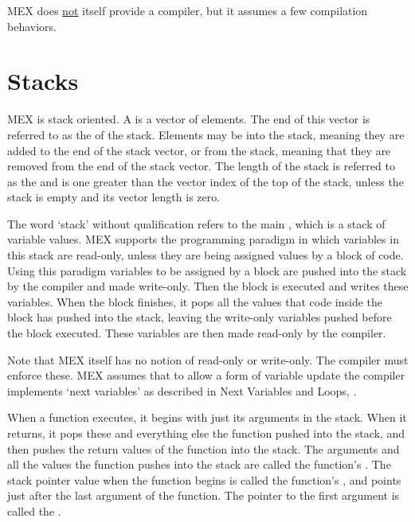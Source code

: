 \documentclass[12pt]{article}
\begin{document}
MEX does \underline{not} itself provide a compiler, but it
assumes a few compilation behaviors.

\section{Stacks}
\label{STACKS}

MEX is stack oriented.  A  is a vector of
elements.  The end of this vector is referred to as the
 of the stack.  Elements may be 
into the stack, meaning they are added to the end of the stack vector,
or  from the stack,
meaning that they are removed from the
end of the stack vector. The length of the stack is referred to as the
 and is one greater than the vector index of the top of
the stack, unless the stack is empty and its vector length is zero.

The word `stack' without qualification refers to the main
\label{PROCESS-STACK},
which is a stack of  variable values.
MEX supports the programming paradigm
in which variables in this stack are read-only, unless
they are being assigned values by a block of code.  Using this paradigm
variables to be assigned by a block are pushed into the stack
by the compiler and made write-only.  Then the block is executed
and writes these variables.  When the block finishes, it pops
all the values that code inside the block has pushed into the stack,
leaving the write-only variables pushed before the block executed.
These variables are then made read-only by the compiler.

Note that MEX itself has no notion of read-only or write-only.
The compiler must enforce these.  MEX assumes that to allow
a form of variable update the compiler implements `next variables'
as described in Next Variables and Loops, .

When a function executes, it begins with just its arguments
in the stack.  When it returns, it pops these and everything
else the function pushed into the stack, and then pushes
the return values of the function into the stack.
The arguments and all the values the function pushes into the
stack are called the function's .  The stack pointer
value when the function begins is called the function's
, and points just after the last argument
of the function.  The pointer to the first argument is called
the .
\end{document}
